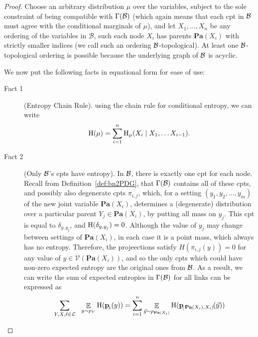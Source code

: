 \documentclass{article}
\newcommand{\bp}[1][L]{\mat{p}_{\!_#1\!}}
\newcommand{\V}{\mathcal V}
\newcommand\Pa{\mathbf{Pa}}
\numberwithin{equation}{section}
\begin{document}
		
	\thmbnsRpdgs*	
	\begin{proof}%
		Choose an arbitrary distribution $\mu$ over the variables, subject to the sole constraint of being compatible with $\Gamma(\cal B)$ (which again means that each cpt in $\cal B$ must agree with the conditional marginals of $\mu$), and let $X_1, \ldots, X_n$ be any ordering of the variables in $\mathcal B$, such each node $X_i$ has parents $\Pa(X_i)$ with strictly smaller indices (we call such an ordering $\cal B$-topological). At least one $\cal B$-topological ordering is possible because the underlying graph of $\cal B$ is acyclic. 
		
		We now put the following facts in equational form for ease of use:
		\begin{description}
			\item[Fact 1] (Entropy Chain Rule). using the chain rule for conditional entropy, we can write 
			\[ \mathrm{H}(\mu) = \sum_{i = 1}^n \mathrm{H}_\mu(X_i \mid X_1, \ldots X_{i-1}). \]
			\item[Fact 2] (Only $\cal B$'s cpts have entropy).
			In $\cal B$, there is exactly one cpt for each node. Recall from Definition~\ref{def:bn2PDG}, that $\Gamma(\cal B)$ contains all of these cpts, and possibly also degenerate cpts $\pi_{i,j}$, which, for a setting $(y_1, y_2, \ldots, y_m)$ of the new joint variable $\Pa(X_i)$, determines a (degenerate) distribution over a particular parent $Y_j \in \Pa(X_i)$, by putting all mass on $y_j$. This cpt is equal to $\delta_{y, y_j}$, and $\mathrm{H}(\delta_{y, y_j}) = 0$. Although the value of $y_j$ may change between settings of $\Pa(X_i)$, in each case it is a point mass, which always has no entropy. 
			Therefore, the projeections satisfy $H(\pi_{i,j}(y)) = 0$ for any value of $y \in \V(\Pa(X_i))$, and so the only cpts which could have non-zero expected entropy are the original ones from $\cal B$. As a result, we can write the sum of expected entropies in $\Gamma(\cal B)$ for all links can be expressed as
			\[\sum_{Y,X, \ell \in \cal L} ~~\E_{y \sim p_Y}  \H (\bp ( y)) = \sum_{i=1}^n\E_{\vec y \sim p_{\Pa(X_i)}}  \H (\bp[(\Pa(X_i),X_i)] (\vec y))\]
			

\end{description}
\end{proof}
\end{document}
